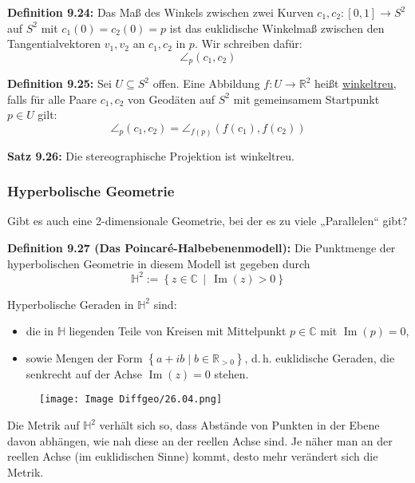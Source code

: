 \documentclass[fleqn, 12pt, letterpaper]{article}
\begin{document}
\vspace{1cm}

\textbf{Definition 9.24:}  
Das Maß des Winkels zwischen zwei Kurven \( c_1, c_2 \colon [0,1] \to S^2 \) auf \( S^2 \) mit \( c_1(0) = c_2(0) = p \) ist das euklidische Winkelmaß zwischen den Tangentialvektoren \( v_1, v_2 \) an \( c_1, c_2 \) in \( p \). Wir schreiben dafür:
\[
\angle_p(c_1, c_2)
\]

\medskip

\textbf{Definition 9.25:}  
Sei \( U \subseteq S^2 \) offen. Eine Abbildung \( f \colon U \to \mathbb{R}^2 \) heißt \underline{winkeltreu}, falls für alle Paare \( c_1, c_2 \) von Geodäten auf \( S^2 \) mit gemeinsamem Startpunkt \( p \in U \) gilt:
\[
\angle_p(c_1, c_2) = \angle_{f(p)}(f(c_1), f(c_2))
\]

\medskip

\textbf{Satz 9.26:}  
Die stereographische Projektion ist winkeltreu.

\subsubsection*{Hyperbolische Geometrie}
Gibt es auch eine 2-dimensionale Geometrie, bei der es zu viele „Parallelen“ gibt?

\medskip

\textbf{Definition 9.27 (Das Poincaré-Halbebenenmodell):}  
Die Punktmenge der hyperbolischen Geometrie in diesem Modell ist gegeben durch
\[
\mathbb{H}^2 := \left\{ z \in \mathbb{C} \,\middle|\, \operatorname{Im}(z) > 0 \right\}
\]

{Hyperbolische Geraden} in \( \mathbb{H}^2 \) sind:
\begin{itemize}
    \item die in \( \mathbb{H} \) liegenden Teile von Kreisen mit Mittelpunkt \( p \in \mathbb{C} \) mit \( \operatorname{Im}(p) = 0 \),
    
    \item sowie Mengen der Form \( \left\{ a + i b \mid b \in \mathbb{R}_{>0} \right\} \), d.\,h. euklidische Geraden, die senkrecht auf der Achse \( \operatorname{Im}(z) = 0 \) stehen.
\end{itemize}
       \begin{figure}[H]
    \centering
    \texttt{[image: Image Diffgeo/26.04.png]}
 \end{figure}

 Die Metrik auf \( \mathbb{H}^2 \) verhält sich so, dass Abstände von Punkten in der Ebene davon abhängen, wie nah diese an der reellen Achse sind. Je näher man an der reellen Achse (im euklidischen Sinne) kommt, desto mehr verändert sich die Metrik.
\end{document}
